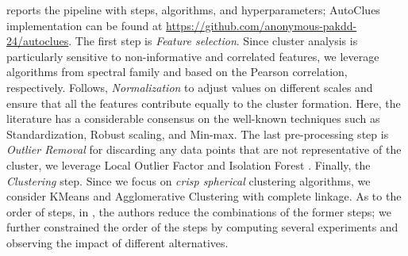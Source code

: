  reports the pipeline with steps, algorithms, and hyperparameters; AutoClues implementation can be found at \url{https://github.com/anonymous-pakdd-24/autoclues}.
The first step is \textit{Feature selection}.
Since cluster analysis is particularly sensitive to non-informative and correlated features, we leverage algorithms from spectral family and based on the Pearson correlation, respectively. 
Follows, \textit{Normalization} to adjust values on different scales and ensure that all the features contribute equally to the cluster formation.
Here, the literature has a considerable consensus on the well-known techniques such as Standardization, Robust scaling, and Min-max.
The last pre-processing step is \textit{Outlier Removal} for discarding any data points that are not representative of the cluster, we leverage Local Outlier Factor \cite{breunig2000lof} and Isolation Forest \cite{liu2012isolation}.
Finally, the \textit{Clustering} step.
Since we focus on \textit{crisp spherical} clustering algorithms, we consider KMeans \cite{arthur2006k} and Agglomerative Clustering \cite{murtagh2017algorithms} with complete linkage.
As to the order of steps, in \cite{giovanelli2022data}, the authors reduce the combinations of the former steps; we further constrained the order of the steps by computing several experiments and observing the impact of different alternatives.

